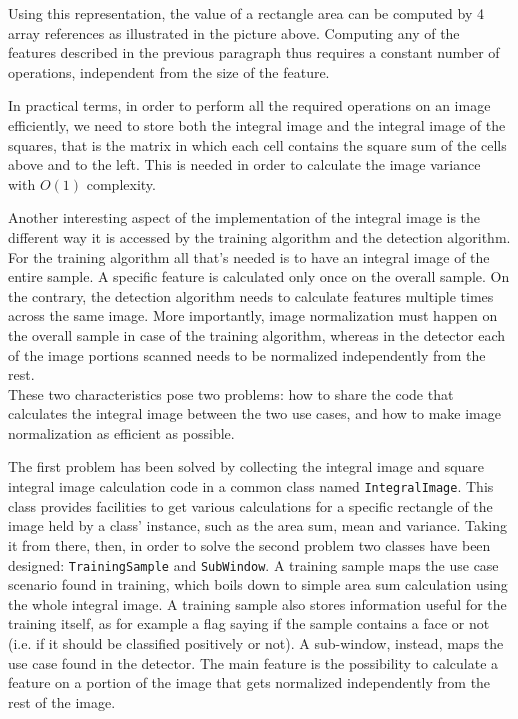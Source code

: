 \documentclass[a4paper,11pt,titlepage]{article}
\begin{document}
Using this representation, the value of a rectangle area can be computed by 4
array references as illustrated in the picture above. Computing any of the
features described in the previous paragraph thus requires a constant number of
operations, independent from the size of the feature.

In practical terms, in order to perform all the required operations on an image
efficiently, we need to store both the integral image and the integral image of
the squares, that is the matrix in which each cell contains the square sum of
the cells above and to the left. This is needed in order to calculate the image
variance with $O(1)$ complexity.

Another interesting aspect of the implementation of the integral image is the
different way it is accessed by the training algorithm and the detection
algorithm. For the training algorithm all that's needed is to have an integral
image of the entire sample. A specific feature is calculated only once on the
overall sample. On the contrary, the detection algorithm needs to calculate
features multiple times across the same image. More importantly, image
normalization must happen on the overall sample in case of the training
algorithm, whereas in the detector each of the image portions scanned needs to
be normalized independently from the rest. \\
These two characteristics pose two problems: how to share the code that
calculates the integral image between the two use cases, and how to make image
normalization as efficient as possible.

The first problem has been solved by collecting the integral image and square
integral image calculation code in a common class named \texttt{IntegralImage}.
This class provides facilities to get various calculations for a specific
rectangle of the image held by a class' instance, such as the area sum, mean and
variance.  Taking it from there, then, in order to solve the second problem two
classes have been designed: \texttt{TrainingSample} and \texttt{SubWindow}. A
training sample maps the use case scenario found in training, which boils down
to simple area sum calculation using the whole integral image. A training sample
also stores information useful for the training itself, as for example a flag
saying if the sample contains a face or not (i.e. if it should be classified
positively or not). A sub-window, instead, maps the use case found in the
detector. The main feature is the possibility to calculate a feature on a
portion of the image that gets normalized independently from the rest of the
image.
\end{document}
